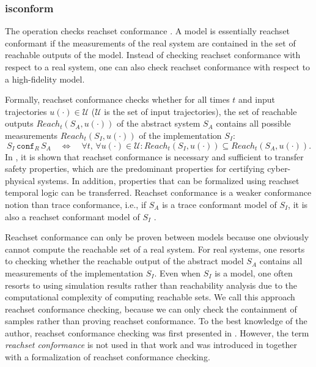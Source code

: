 \subsubsection{isconform} \label{sec:isconform}

The operation  checks reachset conformance \cite{Althoff2023a,Roehm2019a}. A model is essentially reachset conformant if the measurements of the real system are contained in the set of reachable outputs of the model. Instead of checking reachset conformance with respect to a real system, one can also check reachset conformance with respect to a high-fidelity model. %

Formally, reachset conformance checks whether for all times $t$ and input trajectories $u(\cdot) \in \mathcal{U}$ ($\mathcal{U}$ is the set of input trajectories), the set of reachable outputs $Reach_t(S_A, u(\cdot))$ of the abstract system $S_A$ contains all possible measurements $Reach_t(S_I, u(\cdot))$ of the implementation $S_I$: 
\begin{equation*}
S_I \, \mathtt{conf}_R \, S_A \quad\Longleftrightarrow\quad \forall t, \, \forall u(\cdot) \in \mathcal{U}: Reach_t(S_I, u(\cdot))  \subseteq Reach_t(S_A, u(\cdot)).
\end{equation*}
In \cite[Thm.~1.]{Roehm2022}, it is shown that reachset conformance is necessary and sufficient to transfer safety properties, which are the predominant properties for certifying cyber-physical systems. In addition, properties that can be formalized using reachset temporal logic \cite{Roehm2016b} can be transferred. Reachset conformance is a weaker conformance notion than trace conformance, i.e., if $S_A$ is a trace conformant model of $S_I$, it is also a reachset conformant model of $S_I$ \cite[Thm.~2]{Roehm2022}.

Reachset conformance can only be proven between models because one obviously cannot compute the reachable set of a real system. For real systems, one resorts to checking whether the reachable output of the abstract model $S_A$ contains all measurements of the implementation $S_I$. Even when $S_I$ is a model, one often resorts to using simulation results rather than reachability analysis due to the computational complexity of computing reachable sets. We call this approach reachset conformance checking, because we can only check the containment of samples rather than proving reachset conformance. To the best knowledge of the author, reachset conformance checking was first presented in \cite{Althoff2012b}. However, the term \textit{reachset conformance} is not used in that work and was introduced in \cite{Roehm2016} together with a formalization of reachset conformance checking. 

